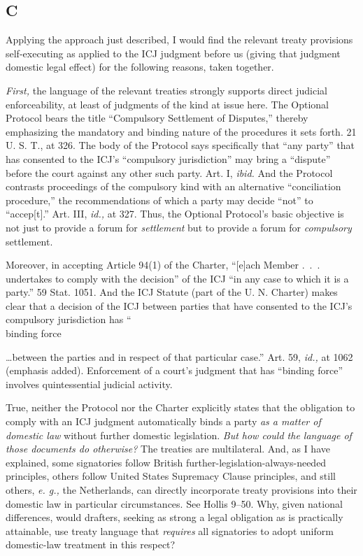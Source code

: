 {{\subsection{C}

  Applying the approach just described, I would find the relevant treaty
provisions self-executing as applied to the ICJ judgment before us
(giving that judgment domestic legal effect) for the following reasons,
taken together.

  \emph{First,} the language of the relevant treaties strongly supports
direct judicial enforceability, at least of judgments of the kind
at issue here. The Optional Protocol bears the title ``Compulsory
Settlement of Disputes,'' thereby emphasizing the mandatory and binding
nature of the procedures it sets forth. 21 U. S. T., at 326. The body of
the Protocol says specifically that ``any party'' that has consented
to the ICJ's ``compulsory jurisdiction'' may bring a ``dispute''
before the court against any other such party. Art. I, \emph{ibid.}
And the Protocol contrasts proceedings of the compulsory kind with
an alternative ``conciliation procedure,'' the recommendations of
which a party may decide ``not'' to ``accep[t].'' Art. III,
\emph{id.,} at 327. Thus, the Optional Protocol's basic objective is
not just to provide a forum for \emph{settlement} but to provide a forum
for \emph{compulsory} settlement.

  Moreover, in accepting Article 94(1) of the Charter, ``[e]ach Member
.~.~. undertakes to comply with the decision'' of the ICJ ``in
any case to which it is a party.'' 59 Stat. 1051. And the ICJ
Statute (part of the U. N. Charter) makes clear that a decision of
the ICJ between parties that have consented to the ICJ's compulsory
jurisdiction has ``\\binding force}\dots between the parties
and in respect of that particular case.'' Art. 59, \emph{id.,} at
1062 (emphasis added). Enforcement of a court's judgment that has
``binding force'' involves quintessential judicial activity.\newpage 

  True, neither the Protocol nor the Charter explicitly states that the
obligation to comply with an ICJ judgment automatically binds a party
\emph{as a matter of domestic law} without further domestic legislation.
\emph{But how could the language of those documents do otherwise?} The
treaties are multilateral. And, as I have explained, some signatories
follow British further-legislation-always-needed principles, others
follow United States Supremacy Clause principles, and still others,
\emph{e. g.,} the Netherlands, can directly incorporate treaty provisions
into their domestic law in particular circumstances. See Hollis 9--50.
Why, given national differences, would drafters, seeking as strong a
legal obligation as is practically attainable, use treaty language that
\emph{requires} all signatories to adopt uniform domestic-law treatment in
this respect?

}
